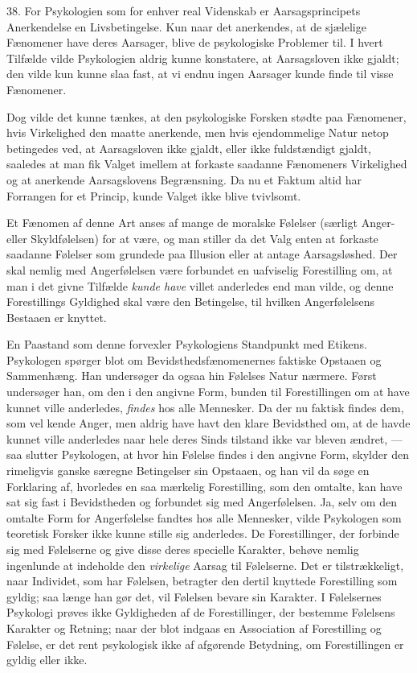 \documentclass[12pt,a4paper,openany]{book}
\newcommand{\opage}[1]{\marginnote{\footnotesize\textit{[#1]}}}
\begin{document}
38. For Psykologien som for enhver real Videnskab er Aarsagsprincipets
Anerkendelse en Livsbetingelse. Kun naar det anerkendes, at de sjælelige
Fænomener have deres Aarsager, blive de psykologiske Problemer til. I hvert
Tilfælde vilde Psykologien aldrig kunne konstatere, at Aarsagsloven ikke
gjaldt; den vilde kun kunne slaa fast, at vi endnu ingen Aarsager kunde finde
til visse Fænomener.

Dog vilde det kunne tænkes, at den psykologiske Forsken stødte paa Fænomener,
hvis Virkelighed den maatte anerkende, men hvis ejendommelige Natur netop
betingedes ved, at Aarsagsloven ikke gjaldt, eller ikke fuldstændigt gjaldt,
saaledes at man fik Valget imellem at forkaste saadanne Fænomeners Virkelighed
og at anerkende Aarsagslovens Begrænsning. Da nu et Faktum altid har Forrangen
for et Princip, kunde Valget ikke blive tvivlsomt.

Et Fænomen af denne Art anses af mange de moralske Følelser (særligt Anger-
eller Skyldfølelsen) for at være, og man stiller da det Valg enten at forkaste
saadanne Følelser som grundede paa Illusion eller at antage Aarsagsløshed. Der
skal nemlig med Angerfølelsen være forbundet en uafviselig Forestilling om, at
man i det givne Tilfælde \emph{kunde have} villet anderledes end man vilde, og
denne Forestillings Gyldighed skal være den Betingelse, til hvilken
Angerfølelsens Bestaaen er knyttet.

En Paastand som denne forvexler Psykologiens Standpunkt med Etikens. Psykologen
spørger blot om Bevidsthedsfænomenernes faktiske Opstaaen og Sammenhæng. Han
undersøger da ogsaa hin Følelses Natur nærmere. Først undersøger han, om den i
den angivne Form, bunden til Forestillingen om at have kunnet ville anderledes,
\emph{findes} hos alle Mennesker. Da der nu faktisk findes dem, som vel kende
Anger, men aldrig have havt den klare Bevidsthed om, at de havde kunnet ville
anderledes naar hele deres Sinds%
\setcounter{footnote}{0}%
\opage{93}tilstand ikke var bleven ændret, --- saa slutter Psykologen, at hvor
hin Følelse findes i den angivne Form, skylder den rimeligvis ganske særegne
Betingelser sin Opstaaen, og han vil da søge en Forklaring af, hvorledes en saa
mærkelig Forestilling, som den omtalte, kan have sat sig fast i Bevidstheden og
forbundet sig med Angerfølelsen. Ja, selv om den omtalte Form for Angerfølelse
fandtes hos alle Mennesker, vilde Psykologen som teoretisk Forsker ikke kunne
stille sig anderledes. De Forestillinger, der forbinde sig med Følelserne og
give disse deres specielle Karakter, behøve nemlig ingenlunde at indeholde den
\emph{virkelige} Aarsag til Følelserne. Det er tilstrækkeligt, naar Individet,
som har Følelsen, betragter den dertil knyttede Forestilling som gyldig; saa
længe han gør det, vil Følelsen bevare sin Karakter. I Følelsernes Psykologi
prøves ikke Gyldigheden af de Forestillinger, der bestemme Følelsens Karakter
og Retning; naar der blot indgaas en Association af Forestilling og Følelse, er
det rent psykologisk ikke af afgørende Betydning, om Forestillingen er gyldig
eller ikke.
\end{document}
